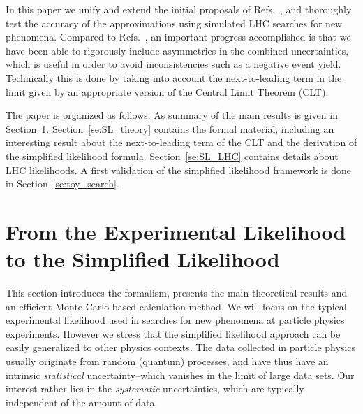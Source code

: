 \documentclass[11pt]{article}
\begin{document}
In this paper we unify and extend the initial proposals of Refs.~\cite{Fichet:2016gvx,SL_note}, and thoroughly test the accuracy of the approximations using simulated LHC searches for new phenomena.
Compared to Refs.~\cite{Fichet:2016gvx,SL_note}, an important progress accomplished is that we have been able to rigorously include asymmetries in the combined uncertainties, which is useful in order to avoid inconsistencies such as a negative event yield. Technically this is done by taking into account the next-to-leading term in the limit given by an appropriate version of the Central Limit Theorem (CLT).

The paper is organized as follows. As summary of the main results is given in Section~\ref{se:EL_SL}. Section~\ref{se:SL_theory} contains the formal material, including
an interesting result about the next-to-leading term of the CLT and the derivation of the simplified likelihood formula. Section~\ref{se:SL_LHC} contains details about LHC likelihoods. A first validation of the simplified likelihood framework is done in Section~\ref{se:toy_search}.








\section{From the Experimental Likelihood to the Simplified Likelihood}
\label{se:EL_SL}

This section introduces the formalism, presents the main theoretical results and an efficient Monte-Carlo based calculation method. We will focus on the typical experimental likelihood used in searches for new phenomena at particle physics experiments. However we stress that the simplified likelihood approach can be easily generalized to other physics contexts.
The data collected in particle physics usually originate from random (quantum) processes, and have thus have an intrinsic \textit{statistical} uncertainty--which vanishes in the limit of large data sets. Our interest rather lies in the \textit{systematic} uncertainties, which are typically independent of the amount of data.
\end{document}
